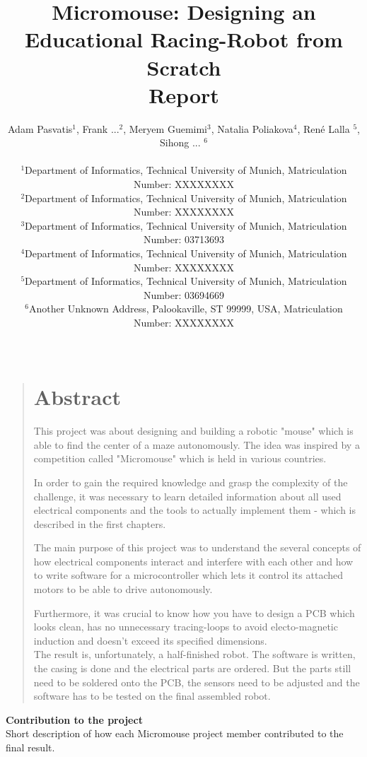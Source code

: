 \documentclass[12pt]{article}
\title{Micromouse: Designing an Educational Racing-Robot from Scratch \\Report}
\author
{Adam Pasvatis$^{1}$, Frank ...$^{2}$, Meryem Guemimi$^{3}$, Natalia Poliakova$^{4}$, René Lalla $^{5}$, Sihong ... $^{6}$\\
\\
\normalsize{$^{1}$Department of Informatics, Technical University of Munich, Matriculation Number: XXXXXXXX}\\
\normalsize{$^{2}$Department of Informatics, Technical University of Munich, Matriculation Number: XXXXXXXX}\\
\normalsize{$^{3}$Department of Informatics, Technical University of Munich, Matriculation Number: 03713693}\\
\normalsize{$^{4}$Department of Informatics, Technical University of Munich, Matriculation Number: XXXXXXXX}\\
\normalsize{$^{5}$Department of Informatics, Technical University of Munich, Matriculation Number: 03694669}\\
\normalsize{$^{6}$Another Unknown Address, Palookaville, ST 99999, USA, Matriculation Number: XXXXXXXX}\\
\\
}
\date{}
\newenvironment{sciabstract}{%
\begin{quote} \bf}
{\end{quote}}
\begin{document}

\baselineskip24pt


\maketitle

\newpage

\begin{sciabstract}
  \section*{Abstract}
    This project was about designing and building a robotic "mouse" which is able to find the center of a maze autonomously. The idea was inspired by a competition called "Micromouse" which is held in various countries.

    In order to gain the required knowledge and grasp the complexity of the challenge, it was necessary to learn detailed information about all used electrical components and the tools to actually implement them - which is described in the first chapters.

    The main purpose of this project was to understand the several concepts of how electrical components interact and interfere with each other and how to write software for a microcontroller which lets it control its attached motors to be able to drive autonomously.
    
    Furthermore, it was crucial to know how you have to design a PCB which looks clean, has no unnecessary tracing-loops to avoid electo-magnetic induction and doesn't exceed its specified dimensions.\\

    \noindent
    The result is, unfortunately, a half-finished robot. The software is written, the casing is done and the electrical parts are ordered. But the parts still need to be soldered onto the PCB, the sensors need to be adjusted and the software has to be tested on the final assembled robot.\\

\end{sciabstract}

\newpage

\Large \textbf{Contribution to the project}\\

\normalsize Short description of how each Micromouse project member contributed to the final result.
\end{document}
